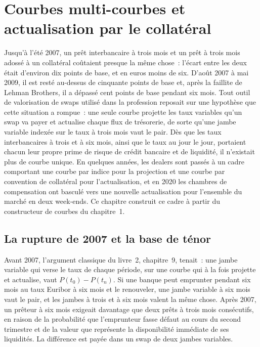 \chapter{Courbes multi-courbes et actualisation par le collatéral}\label{ch:rc:multi-curve-and-collateral-discounting}

Jusqu'à l'été 2007, un prêt interbancaire à trois mois et un prêt à trois mois
adossé à un collatéral coûtaient presque la même chose~: l'écart entre les deux était
d'environ dix points de base, et en euros moins de six. D'août 2007 à mai 2009, il est
resté au-dessus de cinquante points de base et, après la faillite de Lehman Brothers,
il a dépassé cent points de base pendant six mois. Tout outil de valorisation de swaps
utilisé dans la profession reposait sur une hypothèse que cette situation a rompue~:
une seule courbe projette les taux variables qu'un swap va payer et actualise chaque
flux de trésorerie, de sorte qu'une jambe variable indexée sur le taux à trois mois vaut
le pair. Dès que les taux interbancaires à trois et à six mois, ainsi que le taux au
jour le jour, portaient chacun leur propre prime de risque de crédit bancaire et de
liquidité, il n'existait plus de courbe unique. En quelques années, les dealers sont passés
à un cadre comportant une courbe par indice pour la projection et une courbe par convention
de collatéral pour l'actualisation, et en 2020 les chambres de compensation ont basculé
vers une nouvelle actualisation pour l'ensemble du marché en deux week-ends. Ce chapitre construit ce cadre à partir du constructeur de courbes du chapitre~1.

\section{La rupture de 2007 et la base de ténor}

Avant 2007, l'argument classique du livre~2, chapitre~9, tenait~: une jambe variable qui
verse le taux de chaque période, sur une courbe qui à la fois projette et actualise, vaut
$P(t_0)-P(t_n)$. Si une banque peut emprunter pendant six mois au taux Euribor à six mois
et le renouveler, une jambe variable à six mois vaut le pair, et les jambes à trois et à
six mois valent la même chose. Après 2007, un prêteur à six mois exigeait davantage que
deux prêts à trois mois consécutifs, en raison de la probabilité que l'emprunteur fasse
défaut au cours du second trimestre et de la valeur que représente la disponibilité
immédiate de ses liquidités. La différence est payée dans un swap de deux
jambes variables.

